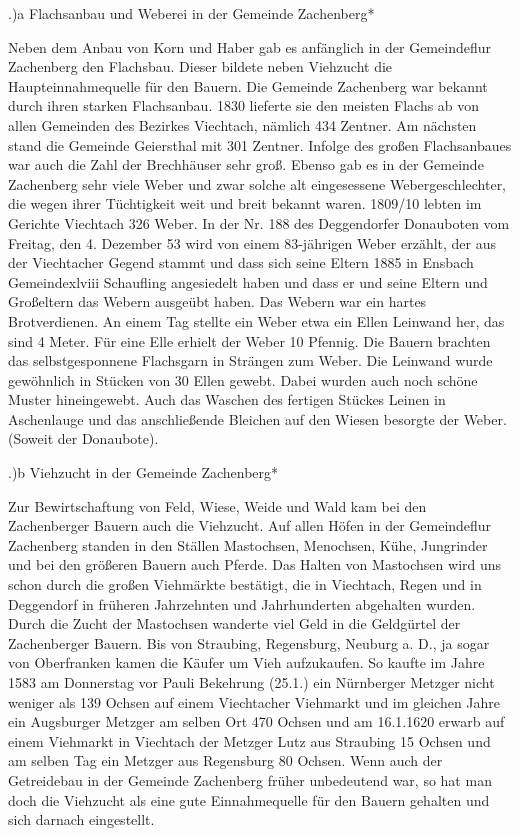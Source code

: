.)a Flachsanbau und Weberei in der Gemeinde Zachenberg*

Neben dem Anbau von Korn und Haber gab es anfänglich in der Gemeindeflur
Zachenberg den Flachsbau. Dieser bildete neben Viehzucht die Haupteinnahmequelle
für den Bauern. Die Gemeinde Zachenberg war bekannt durch ihren starken
Flachsanbau. 1830 lieferte sie den meisten Flachs ab von allen Gemeinden des
Bezirkes Viechtach, nämlich 434 Zentner. Am nächsten stand die Gemeinde
Geiersthal mit 301 Zentner. Infolge des großen Flachsanbaues war auch die Zahl
der Brechhäuser sehr groß. Ebenso gab es in der Gemeinde Zachenberg sehr viele
Weber und zwar solche alt eingesessene Webergeschlechter, die wegen ihrer
Tüchtigkeit weit und breit bekannt waren. 1809/10 lebten im Gerichte Viechtach
326 Weber. In der Nr. 188 des Deggendorfer Donauboten vom Freitag, den 4.
Dezember 53 wird von einem 83-jährigen Weber erzählt, der aus der Viechtacher
Gegend stammt und dass sich seine Eltern 1885 in Ensbach Gemeindexlviii
Schaufling angesiedelt haben und dass er und seine Eltern und Großeltern das
Webern ausgeübt haben. Das Webern war ein hartes Brotverdienen. An einem Tag
stellte ein Weber etwa ein Ellen Leinwand her, das sind 4 Meter. Für eine Elle
erhielt der Weber 10 Pfennig. Die Bauern brachten das selbstgesponnene
Flachsgarn in Strängen zum Weber. Die Leinwand wurde gewöhnlich in Stücken von
30 Ellen gewebt. Dabei wurden auch noch schöne Muster hineingewebt. Auch das
Waschen des fertigen Stückes Leinen in Aschenlauge und das anschließende
Bleichen auf den Wiesen besorgte der Weber. (Soweit der Donaubote).

.)b Viehzucht in der Gemeinde Zachenberg*

Zur Bewirtschaftung von Feld, Wiese, Weide und Wald kam bei den Zachenberger
Bauern auch die Viehzucht. Auf allen Höfen in der Gemeindeflur Zachenberg
standen in den Ställen Mastochsen, Menochsen, Kühe, Jungrinder und bei den
größeren Bauern auch Pferde. Das Halten von Mastochsen wird uns schon durch die
großen Viehmärkte bestätigt, die in Viechtach, Regen und in Deggendorf in
früheren Jahrzehnten und Jahrhunderten abgehalten wurden. Durch die Zucht der
Mastochsen wanderte viel Geld in die Geldgürtel der Zachenberger Bauern. Bis von
Straubing, Regensburg, Neuburg a. D., ja sogar von Oberfranken kamen die Käufer
um Vieh aufzukaufen. So kaufte im Jahre 1583 am Donnerstag vor Pauli Bekehrung
(25.1.) ein Nürnberger Metzger nicht weniger als 139 Ochsen auf einem
Viechtacher Viehmarkt und im gleichen Jahre ein Augsburger Metzger am selben Ort
470 Ochsen und am 16.1.1620 erwarb auf einem Viehmarkt in Viechtach der Metzger
Lutz aus Straubing 15 Ochsen und am selben Tag ein Metzger aus Regensburg 80
Ochsen. Wenn auch der Getreidebau in der Gemeinde Zachenberg früher unbedeutend
war, so hat man doch die Viehzucht als eine gute Einnahmequelle für den Bauern
gehalten und sich darnach eingestellt.

